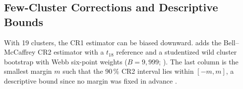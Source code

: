 \documentclass[11pt,a4paper]{article}
\begin{document}
\begin{table}[htbp]
\centering
\caption{Cluster-robust/DeLong ratio and its decomposition. Cross/within: cross-station term over within-station term. Corr.: mean correlation over station pairs of the yearly sums. Null: median [5\,\%, 95\,\%] of the ratio under the within-station permutation, and lower-tail $p$. Demeaned: ratio after removing station or station$\times$month means.}
\label{tab:cancellation}
{\small
{}}
\end{table}

\subsection{Few-Cluster Corrections and Descriptive Bounds}
\label{app:fewclusters}

With 19 clusters, the CR1 estimator can be biased downward.  adds the Bell--McCaffrey CR2 estimator with a $t_{18}$ reference \citep{bell2002} and a studentized wild cluster bootstrap with Webb six-point weights ($B=9{,}999$; \citealp{webb2023}). The last column is the smallest margin $m$ such that the 90\,\% CR2 interval lies within $[-m,m]$, a descriptive bound since no margin was fixed in advance \citep{schuirmann1987,lakens2017}.
\end{document}
